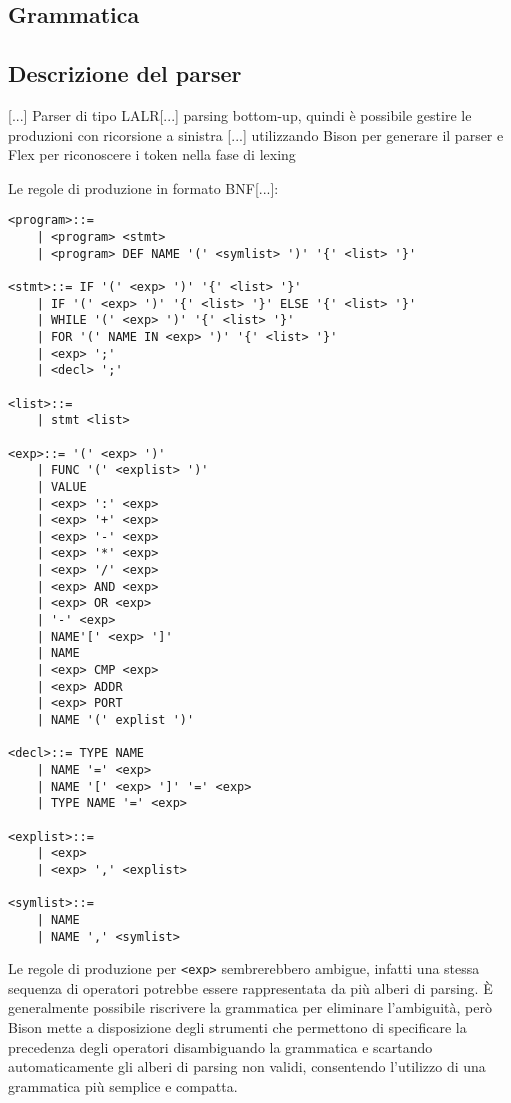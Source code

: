 \documentclass[10pt]{article}
\begin{document}
\subsection{Grammatica}

\subsection{Descrizione del parser}
{[...]} Parser di tipo LALR[...] parsing bottom-up, quindi è possibile gestire le produzioni con ricorsione a sinistra [...] utilizzando Bison per generare il parser e Flex per riconoscere i token nella fase di lexing~\cite{levine2009flex}

Le regole di produzione in formato BNF[...]:

\begin{lstlisting}
<program>::= 
	| <program> <stmt>
	| <program> DEF NAME '(' <symlist> ')' '{' <list> '}'  

<stmt>::= IF '(' <exp> ')' '{' <list> '}' 
	| IF '(' <exp> ')' '{' <list> '}' ELSE '{' <list> '}'  
	| WHILE '(' <exp> ')' '{' <list> '}'    
	| FOR '(' NAME IN <exp> ')' '{' <list> '}'  
	| <exp> ';'
	| <decl> ';'

<list>::=
	| stmt <list> 

<exp>::= '(' <exp> ')'         
	| FUNC '(' <explist> ')' 
	| VALUE              
	| <exp> ':' <exp>         
	| <exp> '+' <exp>         
	| <exp> '-' <exp>         
	| <exp> '*' <exp>          
	| <exp> '/' <exp>          
	| <exp> AND <exp>          
	| <exp> OR <exp>           
	| '-' <exp>
	| NAME'[' <exp> ']'          
	| NAME                 
	| <exp> CMP <exp>          
	| <exp> ADDR             
	| <exp> PORT             
	| NAME '(' explist ')' 

<decl>::= TYPE NAME          
	| NAME '=' <exp>                    
	| NAME '[' <exp> ']' '=' <exp>
	| TYPE NAME '=' <exp>     

<explist>::=
	| <exp>
	| <exp> ',' <explist> 

<symlist>::= 
	| NAME       
	| NAME ',' <symlist>
\end{lstlisting}

Le regole di produzione per \texttt{<exp>} sembrerebbero ambigue, infatti una stessa sequenza di operatori potrebbe essere rappresentata da più alberi di parsing. È generalmente possibile riscrivere la grammatica per eliminare l'ambiguità, però Bison mette a disposizione degli strumenti che permettono di specificare la precedenza degli operatori disambiguando la grammatica e scartando automaticamente gli alberi di parsing non validi, consentendo l'utilizzo di una grammatica più semplice e compatta.
\end{document}
